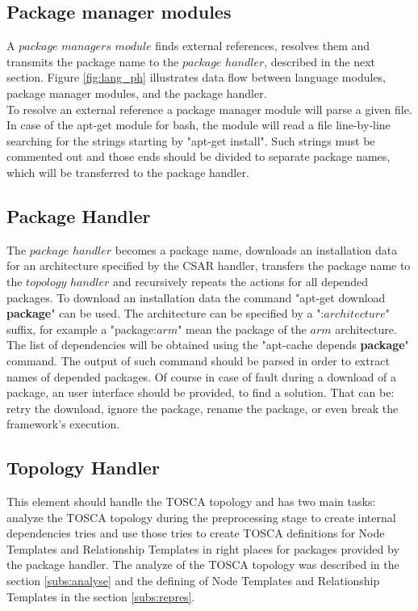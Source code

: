 \subsection{Package manager modules} \label{subs:archpmm}
A $package$ $managers$ $module$ finds external references, resolves them and transmits the package name to the $package$ $handler$, described in the next section.
Figure \ref{fig:lang_ph} illustrates data flow between language modules, package manager modules, and the package handler.\\
To resolve an external reference a package manager module will parse a given file. 
In case of the apt-get module for bash, the module will read a file line-by-line searching for the strings starting by "apt-get install".
Such strings must be commented out and those ends should be divided to separate package names, which will be transferred to the package handler. 


\subsection{Package Handler} \label{subs:archph}
The $package$ $handler$ becomes a package name, downloads an installation data for an architecture specified by the CSAR handler, transfers the package name to the $topology$ $handler$ and recursively repeats the actions for all depended packages. 
To download an installation data the command "apt-get download \textbf{package}" can be used. 
The architecture can be specified by a ":$architecture$" suffix, for example a "package:$arm$" mean the package of the $arm$ architecture.
The list of dependencies will be obtained using the "apt-cache depends \textbf{package}" command. 
The output of such command should be parsed in order to extract names of depended packages.
Of course in case of fault during a download of a package, an user interface should be provided, to find a solution.
That can be: retry the download, ignore the package, rename the package, or even break the framework's execution.

\subsection{Topology Handler} \label{subs:archtop}
This element should handle the TOSCA topology and has two main tasks: analyze the TOSCA topology during the preprocessing stage to create internal dependencies tries and use those tries to create TOSCA definitions for Node Templates and Relationship Templates in right places for packages provided by the package handler.
The analyze of the TOSCA topology was described in the section \ref{subs:analyse} and the defining of Node Templates and Relationship Templates in the section \ref{subs:repres}.
